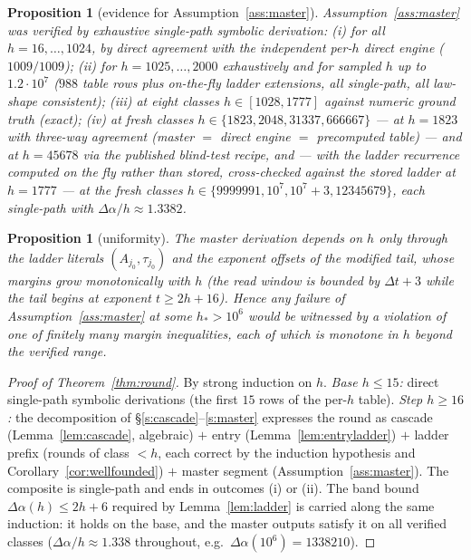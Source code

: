 \documentclass[11pt]{amsart}
\newtheorem{proposition}[theorem]{Proposition}
\theoremstyle{definition}
\begin{document}
\begin{proposition}[evidence for Assumption~\ref{ass:master}]\label{prop:master}
Assumption~\ref{ass:master} was verified by exhaustive single-path symbolic
derivation: (i) for all $h=16,\dots,1024$, by direct agreement with the
independent per-$h$ direct engine ($1009/1009$); (ii) for $h=1025,\dots,2000$
exhaustively and for sampled $h$ up to $1.2\cdot10^{7}$ ($988$ table rows
plus on-the-fly ladder extensions, all single-path, all law-shape
consistent); (iii) at eight classes
$h\in[1028,1777]$ against numeric ground truth (exact); (iv) at fresh
classes $h\in\{1823,2048,31337,666667\}$ --- at $h=1823$ with three-way
agreement (master $=$ direct engine $=$ precomputed table) --- and at
$h=45678$ via the published blind-test recipe, and --- with the ladder
recurrence computed on the fly rather than stored, cross-checked against
the stored ladder at $h=1777$ --- at the fresh classes
$h\in\{9999991,10^{7},10^{7}{+}3,12345679\}$, each single-path with
$\Delta\alpha/h\approx1.3382$.
\end{proposition}

\begin{proposition}[uniformity]\label{prop:uniform}
The master derivation depends on $h$ only through the ladder literals
$(A_{j_0},\tau_{j_0})$ and the exponent offsets of the modified tail, whose
margins grow monotonically with $h$ (the read window is bounded by
$\Delta t+3$ while the tail begins at exponent $t\ge2h+16$). Hence any
failure of Assumption~\ref{ass:master} at some $h_\ast>10^{6}$ would be
witnessed by a violation of one of finitely many margin inequalities, each
of which is monotone in $h$ beyond the verified range.
\end{proposition}

\begin{proof}[Proof of Theorem~\ref{thm:round}]
By strong induction on $h$. \emph{Base $h\le15$:} direct single-path
symbolic derivations (the first $15$ rows of the per-$h$ table).
\emph{Step $h\ge16$:} the decomposition of \S\ref{s:cascade}--\ref{s:master}
expresses the round as cascade (Lemma~\ref{lem:cascade}, algebraic) $+$
entry (Lemma~\ref{lem:entryladder}) $+$ ladder prefix (rounds of class
$<h$, each correct by the induction hypothesis and
Corollary~\ref{cor:wellfounded}) $+$ master segment
(Assumption~\ref{ass:master}). The composite is single-path and ends in
outcomes (i) or (ii). The band bound $\Delta\alpha(h)\le2h+6$ required by
Lemma~\ref{lem:ladder} is carried along the same induction: it holds on the
base, and the master outputs satisfy it on all verified classes
($\Delta\alpha/h\approx1.338$ throughout, e.g.\ $\Delta\alpha(10^6)
=1338210$).
\end{proof}
\end{document}
